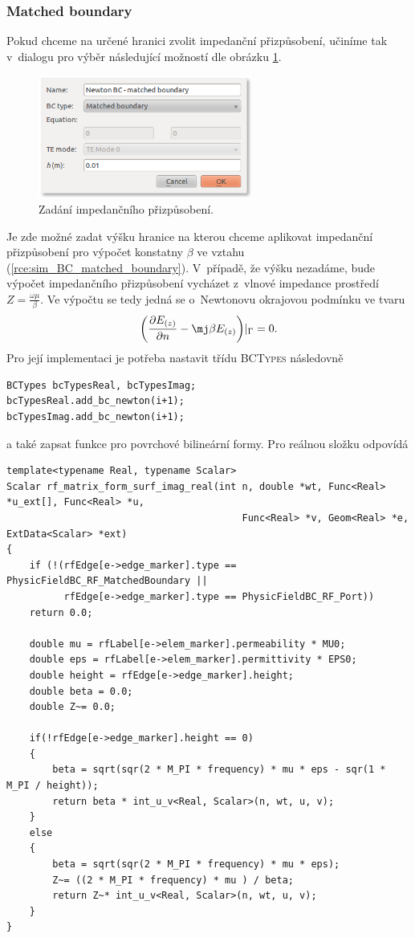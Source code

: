 \subsubsection*{Matched boundary}
Pokud chceme na určené hranici zvolit impedanční přizpůsobení, učiníme tak v~dialogu pro výběr následující možností dle obrázku \ref{obr:sim_BC_matched_boundary}. 
\begin{figure}[!h]
	\centering
	\includegraphics[width=7cm]{sim_BC_matched_boundary.png}
	\caption{Zadání impedančního přizpůsobení.}
	\label{obr:sim_BC_matched_boundary}
\end{figure}
Je zde možné zadat výšku hranice na kterou chceme aplikovat impedanční přizpůsobení pro výpočet konstatny $\beta$ ve vztahu (\ref{rce:sim_BC_matched_boundary}). V~případě, že výšku nezadáme, bude výpočet impedančního přizpůsobení vycházet z~vlnové impedance prostředí $Z = \frac{\omega\mu}{\beta}$. Ve výpočtu se tedy jedná se o~Newtonovu okrajovou podmínku ve tvaru
\begin{equation}
	\bigg(\frac{\partial E_{(z)}}{\partial n} - \mj\beta E_{(z)}\bigg)|_{\Gamma} = 0.
	\label{rce:sim_BC_matched_boundary}
\end{equation}
Pro její implementaci je potřeba nastavit třídu \textsc{BCTypes} následovně
\begin{verbatim}
BCTypes bcTypesReal, bcTypesImag;
bcTypesReal.add_bc_newton(i+1);
bcTypesImag.add_bc_newton(i+1);              
\end{verbatim}
a také zapsat funkce pro povrchové bilineární formy. Pro reálnou složku odpovídá 
\begin{verbatim}
template<typename Real, typename Scalar>
Scalar rf_matrix_form_surf_imag_real(int n, double *wt, Func<Real> *u_ext[], Func<Real> *u,
                                         Func<Real> *v, Geom<Real> *e, ExtData<Scalar> *ext)
{
    if (!(rfEdge[e->edge_marker].type == PhysicFieldBC_RF_MatchedBoundary ||
          rfEdge[e->edge_marker].type == PhysicFieldBC_RF_Port))
    return 0.0;

    double mu = rfLabel[e->elem_marker].permeability * MU0;
    double eps = rfLabel[e->elem_marker].permittivity * EPS0;
    double height = rfEdge[e->edge_marker].height;
    double beta = 0.0;
    double Z~= 0.0;

    if(!rfEdge[e->edge_marker].height == 0)
    {
        beta = sqrt(sqr(2 * M_PI * frequency) * mu * eps - sqr(1 * M_PI / height));
        return beta * int_u_v<Real, Scalar>(n, wt, u, v);
    }
    else
    {
        beta = sqrt(sqr(2 * M_PI * frequency) * mu * eps);
        Z~= ((2 * M_PI * frequency) * mu ) / beta;
        return Z~* int_u_v<Real, Scalar>(n, wt, u, v);
    }
}
\end{verbatim}
